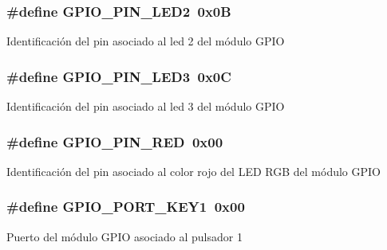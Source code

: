 \subsubsection[{\texorpdfstring{G\+P\+I\+O\+\_\+\+P\+I\+N\+\_\+\+L\+E\+D2}{GPIO_PIN_LED2}}]{\setlength{\rightskip}{0pt plus 5cm}\#define G\+P\+I\+O\+\_\+\+P\+I\+N\+\_\+\+L\+E\+D2~0x0B}\hypertarget{group__hardware_ga5ada73f73636a4fbf726468eb63eb945}{}\label{group__hardware_ga5ada73f73636a4fbf726468eb63eb945}
Identificación del pin asociado al led 2 del módulo G\+P\+IO 
\subsubsection[{\texorpdfstring{G\+P\+I\+O\+\_\+\+P\+I\+N\+\_\+\+L\+E\+D3}{GPIO_PIN_LED3}}]{\setlength{\rightskip}{0pt plus 5cm}\#define G\+P\+I\+O\+\_\+\+P\+I\+N\+\_\+\+L\+E\+D3~0x0C}\hypertarget{group__hardware_ga9e7e83187eae26d02136f609392fabd0}{}\label{group__hardware_ga9e7e83187eae26d02136f609392fabd0}
Identificación del pin asociado al led 3 del módulo G\+P\+IO 
\subsubsection[{\texorpdfstring{G\+P\+I\+O\+\_\+\+P\+I\+N\+\_\+\+R\+ED}{GPIO_PIN_RED}}]{\setlength{\rightskip}{0pt plus 5cm}\#define G\+P\+I\+O\+\_\+\+P\+I\+N\+\_\+\+R\+ED~0x00}\hypertarget{group__hardware_gaa4aae4b49bb53e52b78b530637dcd2d7}{}\label{group__hardware_gaa4aae4b49bb53e52b78b530637dcd2d7}
Identificación del pin asociado al color rojo del L\+ED R\+GB del módulo G\+P\+IO 
\subsubsection[{\texorpdfstring{G\+P\+I\+O\+\_\+\+P\+O\+R\+T\+\_\+\+K\+E\+Y1}{GPIO_PORT_KEY1}}]{\setlength{\rightskip}{0pt plus 5cm}\#define G\+P\+I\+O\+\_\+\+P\+O\+R\+T\+\_\+\+K\+E\+Y1~0x00}\hypertarget{group__hardware_gabce59bc33538c850842e408765ae4981}{}\label{group__hardware_gabce59bc33538c850842e408765ae4981}
Puerto del módulo G\+P\+IO asociado al pulsador 1 
